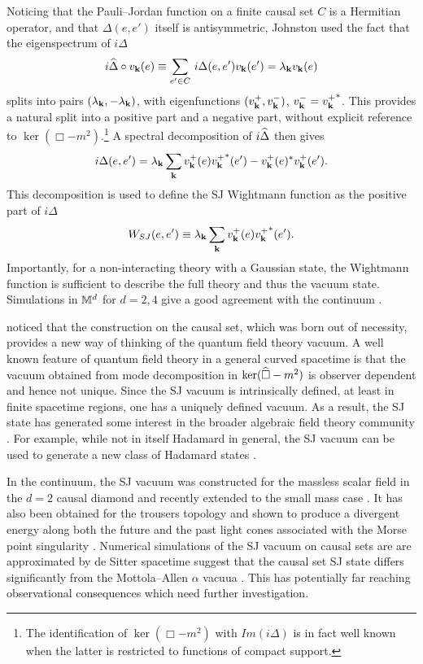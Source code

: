 Noticing that the  Pauli--Jordan function on a {finite}  causal set $C$ is a Hermitian operator, and that
$\Delta(e,e')$ itself is antisymmetric,  Johnston used the fact that the eigenspectrum of $i\Delta$ 
\begin{equation}
i \widehat \Delta \circ v_{\mathbf k}(e) \equiv \sum_{e'\in C} \,i\Delta(e,e')v_{\mathbf k}(e')=\lambda_{\mathbf{k}} v_{\mathbf k}(e)
\end{equation} 
splits into  pairs $(\lambda_{\mathbf{k}}, -\lambda_{\mathbf{k}})$, with  eigenfunctions $(v_{\mathbf k}^+, v_{\mathbf k}^-)$, $v_{\mathbf k}^-={v_{\mathbf k}^+}^\ast$.  
This provides a natural  split  into a positive part and a negative part, without explicit reference to $\ker(\Box
-m^2)$.\footnote{The identification of $\ker(\Box -m^2)$ with $Im(i\Delta)$ is in fact well known \citep{waldqft} when the latter is
restricted to functions of compact support.} A spectral decomposition of $i\widehat \Delta$ then gives 
\begin{equation} 
i \Delta(e,e')=\lambda_{\mathbf{k}}\sum_{\mathbf{k}}v_{\mathbf k}^+(e){v_{\mathbf k}^+}^*(e')-v_{\mathbf k}^+(e)^*{v_{\mathbf k}^+}(e').
\label{modeexp} 
\end{equation}
This decomposition is used to define the SJ Wightmann function as the positive part of $i \Delta$ 
\begin{equation} 
W_{SJ}(e,e') \equiv \lambda_{\mathbf{k}}\sum_{\mathbf{k}}v_{\mathbf k}^+(e){v_{\mathbf k}^+}^*(e'). 
\end{equation} 
Importantly, for a non-interacting theory with a  Gaussian state, the Wightmann function is sufficient to describe
the full theory and thus the vacuum state. Simulations in $\mathbb M^d$ for $d=2,4$  give a  good agreement with the
continuum \citep{johnstontwo,johnstonthesis}.     

\cite{sorkinsj}  noticed  that the construction on the causal set, which was born out of necessity, provides a
new way of thinking of the quantum field theory vacuum.  
A well known feature of quantum field theory in a general curved spacetime is that the vacuum obtained from mode decomposition
in  $\ker(\widehat{\Box}-m^2)$ is observer dependent and hence not unique.  Since the  SJ vacuum is intrinsically defined, at least in finite spacetime
regions, one has a uniquely defined vacuum.   As a result, the SJ state has generated some interest in the broader algebraic field theory community
\citep{fv12,bf14,fewsterart}.  For example, while not in itself Hadamard in general, the SJ vacuum  can be used to generate a new class of Hadamard
states \citep{bf14}.

In the  continuum,  the SJ  vacuum was constructed for the  massless scalar field in the $d=2$ causal
diamond \citep{sj2ddiamond} and recently extended to the small mass case \citep{mathursurya}.  It has also been obtained  for the trousers topology and shown to produce a divergent
energy along both the future and the past light cones associated with the Morse point singularity \citep{sjtrousers}.
Numerical simulations of the SJ vacuum on causal sets are are approximated by 
de Sitter spacetime suggest that the
causal set SJ state differs significantly from the Mottola--Allen $\alpha$ vacuua \citep{sxy}.  This has potentially far
reaching observational consequences which need further investigation.  

